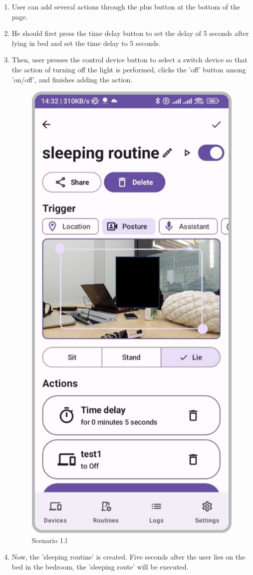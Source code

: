 \begin{enumerate}
\begin{enumerate}
        \item User can add several actions through the plus button at the bottom of the page. \\
        \item He should first press the time delay button to set the delay of 5 seconds after lying in bed and set the time delay to 5 seconds. \\
        \item Then, user presses the control device button to select a switch device so that the action of turning off the light is performed, clicks the 'off' button among 'on/off', and finishes adding the action.\\
        \begin{figure}
            \centering
            \includegraphics[width=0.5\linewidth]{imgs//usercase/usercase_scenario1_12.png}
            \caption{Scenario 1.l}
            \label{fig:enter-label}
        \end{figure}
        \item Now, the 'sleeping routine' is created. Five seconds after the user lies on the bed in the bedroom, the 'sleeping route' will be executed.\\
        \begin{figure}

\end{figure}
\end{enumerate}
\end{enumerate}
